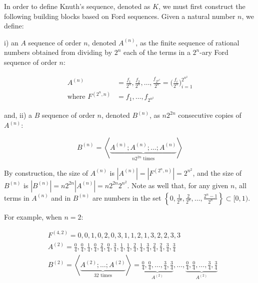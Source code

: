\documentclass[11pt,a4paper]{tesis}
\theoremstyle{plain}
\theoremstyle{definition}
\begin{document}
In order to define Knuth's sequence, denoted as $K$, we must first construct the following building blocks based on Ford sequences. Given a natural number $n$, we define:

i) an $A$ sequence of order $n$, denoted $A^{(n)}$, as the finite sequence of rational numbers obtained from dividing by $2^n$ each of the terms in a $2^n$-ary Ford sequence of order $n$:

\begin{equation*}
  \begin{aligned}
    A^{(n)} & = \frac{f_1}{2^n}, \frac{f_2}{2^n}, \dots, \frac{f_{2^{n^2}}}{2^n} = \bigg( \frac{f_i}{2^n} \bigg)_{i = 1}^{2^{n^2}} \\
    \text{where } F^{(2^n, n)} & = f_1, \dots, f_{2^{n^2}}
  \end{aligned}
\end{equation*}

and, ii) a $B$ sequence of order $n$, denoted $B^{(n)}$, as $n 2^{2 n}$ consecutive copies of $A^{(n)}$:

\begin{equation*}
  B^{(n)} = \left< \underbrace{A^{(n)} ; A^{(n)} ; \dots ; A^{(n)}}_{n 2^{2 n} \text{ times}} \right>
\end{equation*}

By construction, the size of $A^{(n)}$ is $|A^{(n)}| = |F^{(2^n, n)}| = 2^{n^2}$, and the size of $B^{(n)}$ is $|B^{(n)}| = n 2^{2 n} |A^{(n)}| = n 2^{2 n} 2^{n^2}$. Note as well that, for any given $n$, all terms in $A^{(n)}$ and in $B^{(n)}$ are numbers in the set $\left \{ 0, \frac{1}{2^n}, \frac{2}{2^n}, \dots, \frac{2^n - 1}{2^n} \right \} \subset [0, 1)$.

For example, when $n = 2$:

\begin{equation*}
  \begin{aligned}
    & F^{(4, 2)} = 0, 0, 1, 0, 2, 0, 3, 1, 1, 2, 1, 3, 2, 2, 3, 3 \\
    & A^{(2)} = \frac{0}{4}, \frac{0}{4}, \frac{1}{4}, \frac{0}{4}, \frac{2}{4}, \frac{0}{4}, \frac{3}{4}, \frac{1}{4}, \frac{1}{4}, \frac{2}{4}, \frac{1}{4}, \frac{3}{4}, \frac{2}{4}, \frac{2}{4}, \frac{3}{4}, \frac{3}{4} \\
    & B^{(2)} = \left< \underbrace{A^{(2)} ; \dots ; A^{(2)}}_{32 \text{ times}} \right> = \underbrace{\frac{0}{4}, \frac{0}{4}, \dots, \frac{3}{4}, \frac{3}{4}}_{A^{(2)}}, \dots, \underbrace{\frac{0}{4}, \frac{0}{4}, \dots, \frac{3}{4}, \frac{3}{4}}_{A^{(2)}}
  \end{aligned}
\end{equation*}
\end{document}
